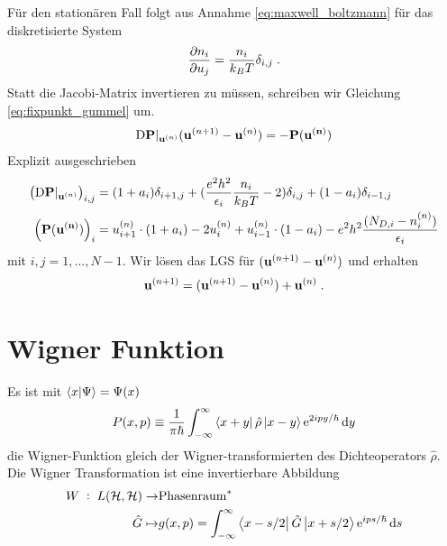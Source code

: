 Für den stationären Fall folgt aus Annahme \eqref{eq:maxwell_boltzmann} für das diskretisierte System
\begin{align}
  \frac{\mathrm{\partial}n_i}{\mathrm{\partial}u_j} = \frac{n_i}{k_B T}\delta_{i,j} \; .
\end{align}
Statt die Jacobi-Matrix invertieren zu müssen, schreiben wir Gleichung \eqref{eq:fixpunkt_gummel} um.
\begin{align}
  \mathrm{D}\vb{P}|_{\vb{u}^{(n)}}(\vb{u}^{(n+1)} - \vb{u}^{(n)}) = -  \vb{P}(\vb{u^{(n)}})
\end{align}
Explizit ausgeschrieben
\begin{align}
  \left(\mathrm{D}\vb{P}|_{\vb{u}^{(n)}}\right)_{i,j} &=
    (1+a_i)\delta_{i+1,j} + ( \frac{e^2h^2}{\epsilon_i}\frac{n_i}{k_B T} - 2) \delta_{i,j} + (1-a_i)\delta_{i-1,j} \\
  \left( \vb{P}(\vb{u^{(n)}}) \right)_{i} &=
   u_{i+1}^{(n)}\cdot(1+a_i) -2 u_i^{(n)} + u_{i-1}^{(n)}\cdot(1-a_i) - e^2h^2\frac{(N_{D,i} - n_i^{(n)})}{\epsilon_i}
\end{align}
mit $i,j = 1,\dots,N-1$. Wir lösen das LGS für $(\vb{u}^{(n+1)} - \vb{u}^{(n)})$ und erhalten
\begin{align}
  \vb{u}^{(n+1)} = (\vb{u}^{(n+1)} - \vb{u}^{(n)}) + \vb{u}^{(n)} \; .
\end{align}



\section{Wigner Funktion}
\label{sec:wignerfunktion}
Es ist mit $\bra{x}\ket{\Psi} = \Psi(x)$
\begin{equation}
  P(x,p) \equiv \frac{1}{\pi\hbar} \int_{-\infty}^{\infty} \bra{x+y}\hat{\rho} \ket{x-y} \text{e}^{2ipy/\hbar} \mathop{}\!\mathrm{d} y
\end{equation}
die Wigner-Funktion gleich der Wigner-transformierten des Dichteoperators $\hat{\rho}$. Die Wigner Transformation ist eine invertierbare Abbildung
\begin{align}
  W\; :\; L(\mathcal{H},\mathcal{H})  \rightarrow & \text{Phasenraum}^* \\
   \hat{G} \mapsto & g(x,p) = \int_{-\infty}^{\infty} \bra{x-s/2}\hat{G} \ket{x+s/2} \text{e}^{ips/\hbar} \mathop{}\!\mathrm{d} s
\end{align}
